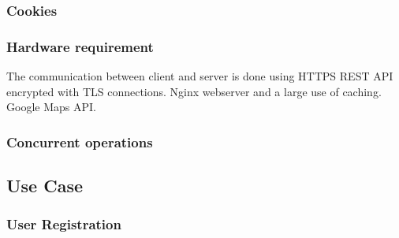\documentclass[english]{article}
\newcounter{requirement}
\begin{document}
\begin{itemize}
\subsubsection{Cookies}



\subsubsection{Hardware requirement}
The communication between client and server is done using HTTPS REST API encrypted with TLS connections.
Nginx webserver and a large use of caching.
Google Maps API.



\subsubsection{Concurrent operations}

\pagebreak
\subsection{Use Case}

\subsubsection{User Registration}

\begin{center}
	

\end{center}
\end{itemize}
\end{document}
